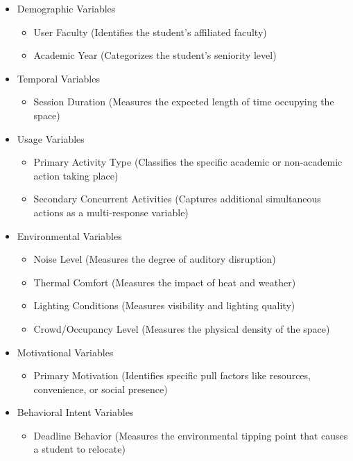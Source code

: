 \documentclass[12pt, a4paper]{report}
\begin{document}
\begin{itemize}
\item Demographic Variables
    \begin{itemize}
        \item User Faculty (Identifies the student's affiliated faculty)
        \item Academic Year (Categorizes the student's seniority level)
    \end{itemize}
\item Temporal Variables
    \begin{itemize}
        \item Session Duration (Measures the expected length of time occupying the space)
    \end{itemize}
\item Usage Variables
    \begin{itemize}
        \item Primary Activity Type (Classifies the specific academic or non-academic action taking place)
        \item Secondary Concurrent Activities (Captures additional simultaneous actions as a multi-response variable)
    \end{itemize}
\item Environmental Variables
    \begin{itemize}
        \item Noise Level (Measures the degree of auditory disruption)
        \item Thermal Comfort (Measures the impact of heat and weather)
        \item Lighting Conditions (Measures visibility and lighting quality)
        \item Crowd/Occupancy Level (Measures the physical density of the space)
    \end{itemize}
\item Motivational Variables
    \begin{itemize}
        \item Primary Motivation (Identifies specific pull factors like resources, convenience, or social presence)
    \end{itemize}
\item Behavioral Intent Variables
    \begin{itemize}
        \item  Deadline Behavior (Measures the environmental tipping point that causes a student to relocate)
    \end{itemize}
\end{itemize}
\end{document}
